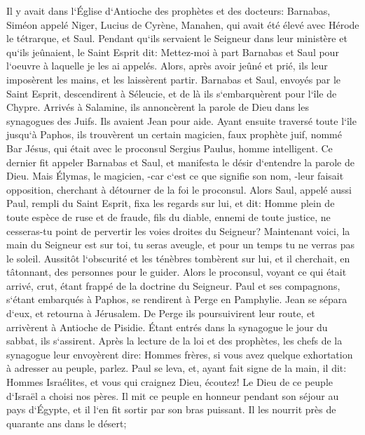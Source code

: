 \verse Il y avait dans l`Église d`Antioche des prophètes et des docteurs: Barnabas, Siméon appelé Niger, Lucius de Cyrène, Manahen, qui avait été élevé avec Hérode le tétrarque, et Saul. 
\verse Pendant qu`ils servaient le Seigneur dans leur ministère et qu`ils jeûnaient, le Saint Esprit dit: Mettez-moi à part Barnabas et Saul pour l`oeuvre à laquelle je les ai appelés. 
\verse Alors, après avoir jeûné et prié, ils leur imposèrent les mains, et les laissèrent partir. 
\verse Barnabas et Saul, envoyés par le Saint Esprit, descendirent à Séleucie, et de là ils s`embarquèrent pour l`île de Chypre. 
\verse Arrivés à Salamine, ils annoncèrent la parole de Dieu dans les synagogues des Juifs. Ils avaient Jean pour aide. 
\verse Ayant ensuite traversé toute l`île jusqu`à Paphos, ils trouvèrent un certain magicien, faux prophète juif, nommé Bar Jésus, 
\verse qui était avec le proconsul Sergius Paulus, homme intelligent. Ce dernier fit appeler Barnabas et Saul, et manifesta le désir d`entendre la parole de Dieu. 
\verse Mais Élymas, le magicien, -car c`est ce que signifie son nom, -leur faisait opposition, cherchant à détourner de la foi le proconsul. 
\verse Alors Saul, appelé aussi Paul, rempli du Saint Esprit, fixa les regards sur lui, et dit: 
\verse Homme plein de toute espèce de ruse et de fraude, fils du diable, ennemi de toute justice, ne cesseras-tu point de pervertir les voies droites du Seigneur? 
\verse Maintenant voici, la main du Seigneur est sur toi, tu seras aveugle, et pour un temps tu ne verras pas le soleil. Aussitôt l`obscurité et les ténèbres tombèrent sur lui, et il cherchait, en tâtonnant, des personnes pour le guider. 
\verse Alors le proconsul, voyant ce qui était arrivé, crut, étant frappé de la doctrine du Seigneur. 
\verse Paul et ses compagnons, s`étant embarqués à Paphos, se rendirent à Perge en Pamphylie. Jean se sépara d`eux, et retourna à Jérusalem. 
\verse De Perge ils poursuivirent leur route, et arrivèrent à Antioche de Pisidie. Étant entrés dans la synagogue le jour du sabbat, ils s`assirent. 
\verse Après la lecture de la loi et des prophètes, les chefs de la synagogue leur envoyèrent dire: Hommes frères, si vous avez quelque exhortation à adresser au peuple, parlez. 
\verse Paul se leva, et, ayant fait signe de la main, il dit: Hommes Israélites, et vous qui craignez Dieu, écoutez! 
\verse Le Dieu de ce peuple d`Israël a choisi nos pères. Il mit ce peuple en honneur pendant son séjour au pays d`Égypte, et il l`en fit sortir par son bras puissant. 
\verse Il les nourrit près de quarante ans dans le désert; 
